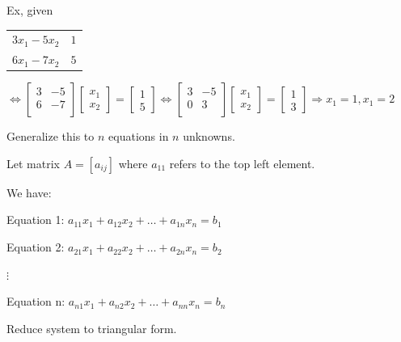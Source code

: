 \documentclass{article}
\begin{document}
Ex, given \begin{tabular}{r@{ $=$ }l}
    $3x_1 - 5x_2$ & $1$\\
    $6x_1 - 7x_2$ & $5$
\end{tabular} $\Leftrightarrow \begin{bmatrix}
3 & -5\\
6 & -7\\
\end{bmatrix}\begin{bmatrix}
x_1\\
x_2
\end{bmatrix} = \begin{bmatrix}
1\\
5
\end{bmatrix} \Leftrightarrow \begin{bmatrix}
3 & -5\\
0 & 3\\
\end{bmatrix}\begin{bmatrix}
x_1\\
x_2
\end{bmatrix} = \begin{bmatrix}
1\\
3
\end{bmatrix} \Rightarrow x_1 = 1, x_1 = 2$

\vspace{0.2cm}

Generalize this to $n$ equations in $n$ unknowns.

Let matrix $A = [a_{ij}]$ where $a_{11}$ refers to the top left element.

\vspace{0.3cm}

We have:

Equation 1: $a_{11} x_1 + a_{12} x_2 + \dots + a_{1n} x_n = b_1$

Equation 2: $a_{21} x_1 + a_{22} x_2 + \dots + a_{2n} x_n = b_2$

 \hspace{2cm} $\vdots$

Equation n: $a_{n1} x_1 + a_{n2} x_2 + \dots + a_{nn} x_n = b_n$

Reduce system to triangular form.
\end{document}
